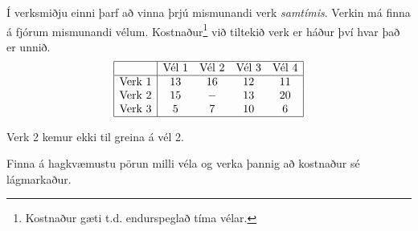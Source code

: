 \begin{daemi}\label{daemi:verkvelar} Í verksmiðju einni þarf að vinna þrjú mismunandi verk \emph{samtímis}. Verkin má finna á fjórum mismunandi vélum. Kostnaður\footnote{Kostnaður gæti t.d. endurspeglað tíma vélar.} við tiltekið verk er háður því hvar það er unnið.
\[ \begin{array}{|l|cccc|} \hline &\textrm{Vél }1&\textrm{Vél }2&\textrm{Vél }3&\textrm{Vél }4\\ \hline
\textrm{Verk }1&13&16&12&11\\
\textrm{Verk }2&15&-&13&20\\
\textrm{Verk }3&5&7&10&6 \\ \hline
   \end{array}\]
\begin{aths}Verk 2 kemur ekki til greina á vél 2.\end{aths}
Finna á hagkvæmustu pörun milli véla og verka þannig að kostnaður sé lágmarkaður. 
\end{daemi}
